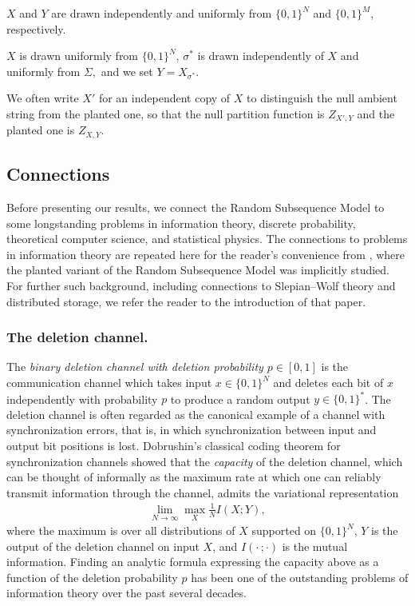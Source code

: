 \documentclass[11pt]{amsart}
\numberwithin{equation}{section}
\numberwithin{equation}{section}
\newcommand{\1}{\mathbbm{1}}
\theoremstyle{definition}
\begin{document}
\medskip

 $X$ and $Y$ are drawn independently and uniformly from $\{0,1\}^N$ and $\{0,1\}^M$, respectively.

\medskip

 $X$ is drawn uniformly from $\{0,1\}^N$, $\sigma^*$ is drawn independently of $X$ and uniformly from $\Sigma,$ and we set $Y = X_{\sigma^*}$.

\medskip

We often write $X'$ for an independent copy of $X$ to distinguish the null ambient string from the planted one, so that the null partition function is $Z_{X',Y}$ and the planted one is $Z_{X,Y}$.

\subsection{Connections} \label{sec:connections}
Before presenting our results, we connect the Random Subsequence Model to some longstanding problems in information theory, discrete probability, theoretical computer science, and statistical physics. The connections to problems in information theory are repeated here for the reader's convenience from \cite{pernice2024mutual}, where the planted variant of the Random Subsequence Model was implicitly studied. For further such background, including connections to Slepian--Wolf theory and distributed storage, we refer the reader to the introduction of that paper.

\subsubsection{The deletion channel.}

The \textit{binary deletion channel with deletion probability $p \in [0,1]$} is the communication channel which takes input $x \in \{0,1\}^N$ and deletes each bit of $x$ independently with probability $p$ to produce a random output $y \in \{0,1\}^*$. The deletion channel is often regarded as the canonical example of a channel with synchronization errors, that is, in which synchronization between input and output bit positions is lost. Dobrushin's classical coding theorem for synchronization channels \cite{dobrushin1967shannon} showed that the \emph{capacity} of the deletion channel, which can be thought of informally as the maximum rate at which one can reliably transmit information through the channel, admits the variational representation
\begin{align*}
    \lim_{N\to\infty} \max_{X} \frac{1}{N} I\left( X; Y \right),
\end{align*}
where the maximum is over all distributions of $X$ supported on $\{0,1\}^N$, $Y$ is the output of the deletion channel on input $X$, and $I(\cdot\,; \cdot)$ is the mutual information. Finding an analytic formula expressing the capacity above as a function of the deletion probability $p$ has been one of the outstanding problems of information theory over the past several decades. 
\end{document}
